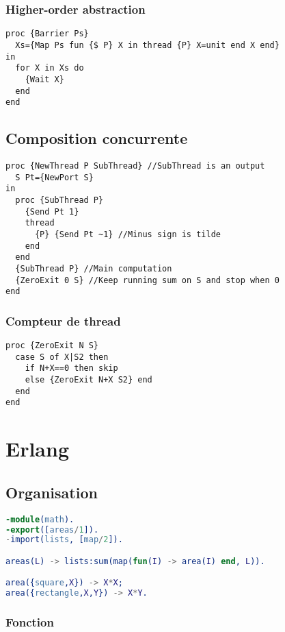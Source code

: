 \documentclass{report}
\begin{document}
\subsubsection*{Higher-order abstraction}
\begin{lstlisting}[escapechar=\%]
proc {Barrier Ps} 
  Xs={Map Ps fun {$ P} X in thread {P} X=unit end X end}
in 
  for X in Xs do 
    {Wait X} 
  end
end
\end{lstlisting}

\subsection{Composition concurrente}
\begin{lstlisting}[escapechar=\%]
proc {NewThread P SubThread} //SubThread is an output 
  S Pt={NewPort S}
in
  proc {SubThread P} 
    {Send Pt 1} 
    thread 
      {P} {Send Pt ~1} //Minus sign is tilde
    end
  end 
  {SubThread P} //Main computation 
  {ZeroExit 0 S} //Keep running sum on S and stop when 0
end
\end{lstlisting}

\subsubsection*{Compteur de thread}
\begin{lstlisting}[escapechar=\%]
proc {ZeroExit N S}
  case S of X|S2 then
    if N+X==0 then skip 
    else {ZeroExit N+X S2} end
  end
end
\end{lstlisting}

\section{Erlang}
\subsection{Organisation}
\begin{lstlisting}[escapechar=\%, language=erlang]
-module(math).
-export([areas/1]).
-import(lists, [map/2]). 

areas(L) -> lists:sum(map(fun(I) -> area(I) end, L)).

area({square,X}) -> X*X;
area({rectangle,X,Y}) -> X*Y.
\end{lstlisting}

\subsubsection{Fonction}
\end{document}
